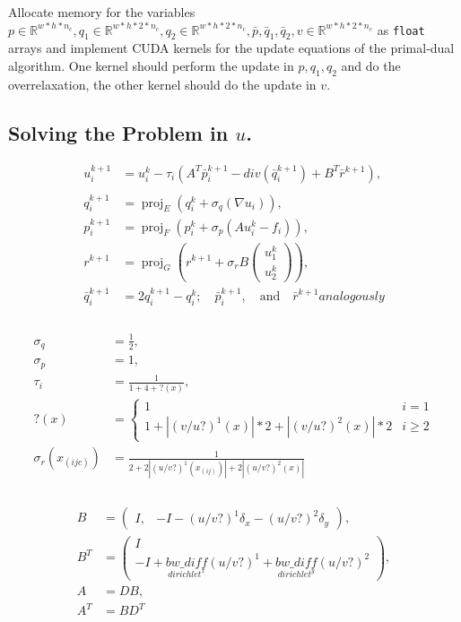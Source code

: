 \documentclass[A4,12pt]{article}
\DeclareMathOperator*{\proj}{proj}
\newcommand{\R}{\mathbb{R}}
\begin{document}
Allocate memory for the variables $p \in \R^{w*h*n_c},q_1 \in \R^{w*h*2*n_c},q_2 \in \R^{w*h*2*n_c},\bar p, \bar q_1, \bar q_2, v \in \R^{w*h*2*n_c}$ as {\tt float} arrays and implement CUDA kernels for the update equations of the primal-dual algorithm. One kernel should perform the update in $p, q_1, q_2$ and do the overrelaxation, the other kernel should do the update in $v$. 

\subsection{Solving the Problem in $u$.}
\begin{equation}
\begin{aligned}
u_i^{k+1}&=u_i^k-\tau_i(A^T\bar p_i^{k+1}-div(\bar q_i^{k+1})+B^T\bar r^{k+1}) , \\
\\
q_i^{k+1}&=\proj_E(q_i^k + \sigma_q (\nabla u_i)), \\
p_i^{k+1}&=\proj_F(p_i^k + \sigma_p (Au_i^k - f_i)), \\
r^{k+1}&=\proj_G(r^{k+1} + \sigma_r B\begin{pmatrix}u_1^k \\ u_2^k\end{pmatrix}), \\
\bar q_i^{k+1}&=2q_i^{k+1}-q_i^k; \quad \bar p_i^{k+1},\quad \textrm{and} \quad \bar r^{k+1} analogously \\
\end{aligned}
\end{equation}
\\
\begin{equation}
\begin{aligned}
\sigma_q &= \frac{1}{2}, \\
\sigma_p &= 1, \\
\tau_i&=\frac{1}{1+4+?(x)}, \\
?(x)&=\begin{cases} 1 & i=1 \\ 1+|(v/u?)^1(x)|*2+|(v/u?)^2(x)|*2 & i \geq 2 \end{cases} \\
\sigma_r (x_{(ijc)}) &= \frac{1}{2+2|(u/v?)^1(x_{(ij)})|+2|(u/v?)^2(x)|} \\
\end{aligned}
\end{equation}
\\
\begin{equation}
\begin{aligned}
B&=\begin{pmatrix}I, &-I-(u/v?)^1\delta_x-(u/v?)^2\delta_y\end{pmatrix}, \\
B^T&=\begin{pmatrix}I \\ -I+\underset{dirichlet^x} {bw\_diff} (u/v?)^1+\underset{dirichlet^y} {bw\_diff} (u/v?)^2\end{pmatrix}, \\
A&=DB, \\
A^T&=BD^T \\
\end{aligned}
\end{equation}
\end{document}
